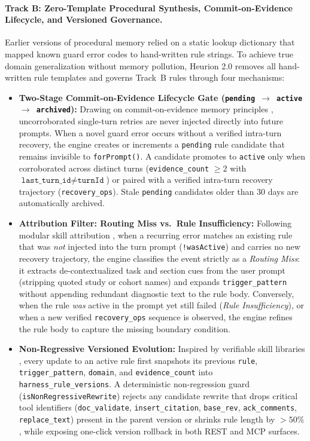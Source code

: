 \documentclass[11pt,a4paper]{article}
\begin{document}
\paragraph{Track B: Zero-Template Procedural Synthesis, Commit-on-Evidence Lifecycle, and Versioned Governance.}
Earlier versions of procedural memory relied on a static lookup dictionary that mapped known guard error codes to hand-written rule strings. To achieve true domain generalization without memory pollution, Heurion 2.0 removes all hand-written rule templates and governs Track~B rules through four mechanisms:
\begin{itemize}[leftmargin=1.5em,itemsep=2pt]
  \item \textbf{Two-Stage Commit-on-Evidence Lifecycle Gate (\texttt{pending $\to$ active $\to$ archived}):} Drawing on commit-on-evidence memory principles \cite{coem2026}, uncorroborated single-turn retries are never injected directly into future prompts. When a novel guard error occurs without a verified intra-turn recovery, the engine creates or increments a \texttt{pending} rule candidate that remains invisible to \texttt{forPrompt()}. A candidate promotes to \texttt{active} only when corroborated across distinct turns (\texttt{evidence\_count} $\ge 2$ with $\texttt{last\_turn\_id} \neq \texttt{turnId}$) or paired with a verified intra-turn recovery trajectory (\texttt{recovery\_ops}). Stale \texttt{pending} candidates older than $30$ days are automatically archived.
  \item \textbf{Attribution Filter: Routing Miss vs.\ Rule Insufficiency:} Following modular skill attribution \cite{memskill2026}, when a recurring error matches an existing rule that was \emph{not} injected into the turn prompt (\texttt{!wasActive}) and carries no new recovery trajectory, the engine classifies the event strictly as a \emph{Routing Miss}: it extracts de-contextualized task and section cues from the user prompt (stripping quoted study or cohort names) and expands \texttt{trigger\_pattern} without appending redundant diagnostic text to the rule body. Conversely, when the rule \emph{was} active in the prompt yet still failed (\emph{Rule Insufficiency}), or when a new verified \texttt{recovery\_ops} sequence is observed, the engine refines the rule body to capture the missing boundary condition.
  \item \textbf{Non-Regressive Versioned Evolution:} Inspired by verifiable skill libraries \cite{skillv2026}, every update to an active rule first snapshots its previous \texttt{rule}, \texttt{trigger\_pattern}, \texttt{domain}, and \texttt{evidence\_count} into \texttt{harness\_rule\_versions}. A deterministic non-regression guard (\texttt{isNonRegressiveRewrite}) rejects any candidate rewrite that drops critical tool identifiers (\texttt{doc\_validate}, \texttt{insert\_citation}, \texttt{base\_rev}, \texttt{ack\_comments}, \texttt{replace\_text}) present in the parent version or shrinks rule length by $>50\%$, while exposing one-click version rollback in both REST and MCP surfaces.

\end{itemize}
\end{document}
